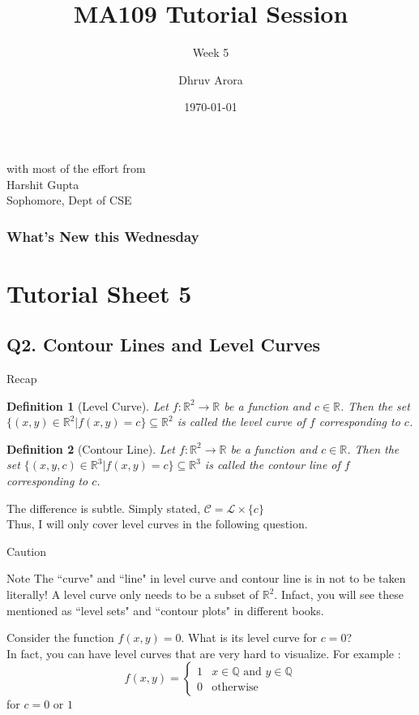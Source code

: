 \documentclass[aspectratio=169]{beamer}
\title{MA109 Tutorial Session}
\subtitle{Week 5}
\author{Dhruv Arora}
\institute{Sophomore, Dept of CSE}
\date{\today}
\newtheorem{df}{Definition}
\newcommand{\bR}{\mathbb{R}}
\newcommand{\bQ}{\mathbb{Q}}
\begin{document}
\begin{frame}
	\titlepage
	\begin{center}
	{\tiny with most of the effort from}\\
	{\small Harshit Gupta}\\
	{\tiny Sophomore, Dept of CSE}
	\end{center}
\end{frame}

\begin{frame}[plain]
\frametitle{What's New this Wednesday}
\tableofcontents
\end{frame}

\section{Tutorial Sheet 5}

\subsection{Q2. Contour Lines and Level Curves
}

\begin{frame}{Recap}
	\uncover<2-> {
	\begin{df}[Level Curve]
		Let $f:\bR^2 \to \bR$ be a function and $c\in\bR$. Then the set $\{(x,y)\in\bR^2 | f(x,y)=c\}\subseteq \bR^2$ is called the level curve of $f$ corresponding to $c$.
	\end{df}
	}
	 {
	\begin{df}[Contour Line]
		Let $f:\bR^2 \to \bR$ be a function and $c\in\bR$. Then the set $\{(x,y,c)\in\bR^3 | f(x,y)=c\}\subseteq \bR^3$ is called the contour line of $f$ corresponding to $c$.
	\end{df}
	}
	 {
	The difference is subtle. Simply stated, $\mathcal{C} = \mathcal{L}\times\{c\}$\\ 
	}
	\uncover<5-> {
	Thus, I will only cover level curves in the following question.
	}
\end{frame}

\begin{frame}{Caution}
	\begin{block}{Note}
	\uncover<2-> {
	The ``curve" and ``line" in level curve and contour line is in not to be taken literally!
	}
	\uncover<3-> {
	A level curve only needs to be a subset of $\bR^2$. Infact, you will see these mentioned as ``level sets" and ``contour plots" in different books.
	}
	\end{block}
	 {
	\vspace*{2mm}
	Consider the function $f(x,y)=0$. What is its level curve for $c=0$?\\[1mm]
	}
	\uncover<5-> {
	In fact, you can have level curves that are very hard to visualize. For example :
	$$f(x,y) = 
	\begin{cases}
		1 & x \in \bQ \text{ and } y \in \bQ\\
		0 & \text{otherwise}
	\end{cases}$$
	for $c=0$ or $1$
	}
\end{frame}
\end{document}
